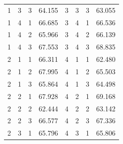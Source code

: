 \documentclass[
12pt,					%
openright,				%
oneside,				%
a4paper,				%
english,
brazil
]{ABNT/abntex2_report}
\begin{document}
\begin{table}[H]
\begin{tabular}{llllllll}
	1                           & 3                        & 3                         & 64.155   & 3                           & 3                        & 3                         & 63.055                        \\
	1                           & 4                        & 1                         & 66.685   & 3                           & 4                        & 1                         & 66.536                        \\
	1                           & 4                        & 2                         & 65.966   & 3                           & 4                        & 2                         & 66.139                       \\
	1                           & 4                        & 3                         & 67.553   & 3                           & 4                        & 3                         & 68.835                     \\
	2                           & 1                        & 1                         & 66.311   & 4                           & 1                        & 1                         & 62.480                        \\
	2                           & 1                        & 2                         & 67.995   & 4                           & 1                        & 2                         & 65.503                       \\
	2                           & 1                        & 3                         & 65.864   & 4                           & 1                        & 3                         & 64.498                       \\
	2                           & 2                        & 1                         & 67.928   & 4                           & 2                        & 1                         & 69.168                       \\
	2                           & 2                        & 2                         & 62.444   & 4                           & 2                        & 2                         & 63.142                        \\
	2                           & 2                        & 3                         & 66.577   & 4                           & 2                        & 3                         & 67.336                        \\
	2                           & 3                        & 1                         & 65.796   & 4                           & 3                        & 1                         & 65.806                        \\

\end{tabular}
\end{table}
\end{document}
